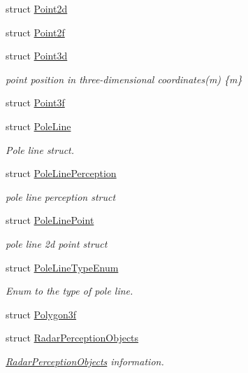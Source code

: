 \begin{DoxyCompactItemize}
struct \hyperlink{structmaf__perception__interface_1_1Point2d}{Point2d}
\item 
struct \hyperlink{structmaf__perception__interface_1_1Point2f}{Point2f}
\item 
struct \hyperlink{structmaf__perception__interface_1_1Point3d}{Point3d}
\begin{DoxyCompactList}\small\item\em point position in three-\/dimensional coordinates(m) \{m\} \end{DoxyCompactList}\item 
struct \hyperlink{structmaf__perception__interface_1_1Point3f}{Point3f}
\item 
struct \hyperlink{structmaf__perception__interface_1_1PoleLine}{Pole\+Line}
\begin{DoxyCompactList}\small\item\em Pole line struct. \end{DoxyCompactList}\item 
struct \hyperlink{structmaf__perception__interface_1_1PoleLinePerception}{Pole\+Line\+Perception}
\begin{DoxyCompactList}\small\item\em pole line perception struct \end{DoxyCompactList}\item 
struct \hyperlink{structmaf__perception__interface_1_1PoleLinePoint}{Pole\+Line\+Point}
\begin{DoxyCompactList}\small\item\em pole line 2d point struct \end{DoxyCompactList}\item 
struct \hyperlink{structmaf__perception__interface_1_1PoleLineTypeEnum}{Pole\+Line\+Type\+Enum}
\begin{DoxyCompactList}\small\item\em Enum to the type of pole line. \end{DoxyCompactList}\item 
struct \hyperlink{structmaf__perception__interface_1_1Polygon3f}{Polygon3f}
\item 
struct \hyperlink{structmaf__perception__interface_1_1RadarPerceptionObjects}{Radar\+Perception\+Objects}
\begin{DoxyCompactList}\small\item\em \hyperlink{structmaf__perception__interface_1_1RadarPerceptionObjects}{Radar\+Perception\+Objects} information. \end{DoxyCompactList}\item 

\end{DoxyCompactItemize}
